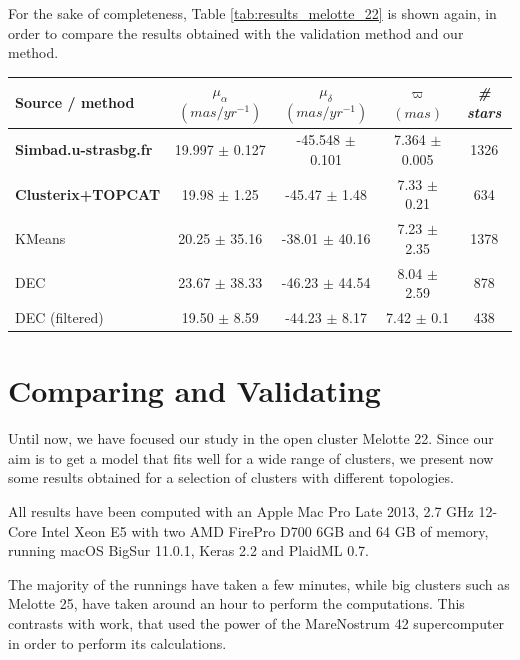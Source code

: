 \documentclass[11pt, a4paper, english]{book}
\begin{document}
For the sake of completeness, Table \ref{tab:results_melotte_22} is shown again,
in order to compare the results obtained with the validation method and our method.

\begin{table}[h!]
  \begin{center}
    \begin{tabular}{l|c|c|c|c}
      \textbf{Source / method} & \textbf{$\mu_{\alpha}$ $(mas/yr^{-1})$} & \textbf{$\mu_{\delta}$ $(mas/yr^{-1})$} & \textbf{$\varpi$ $(mas)$} & \emph{\# stars} \\
      \hline
      \textbf{Simbad.u-strasbg.fr} & 19.997 $\pm$ 0.127 & -45.548 $\pm$ 0.101 & 7.364 $\pm$ 0.005 & 1326 \\
      \textbf{Clusterix+TOPCAT} & 19.98 $\pm$ 1.25 & -45.47 $\pm$ 1.48 & 7.33 $\pm$ 0.21 & 634 \\
      KMeans & 20.25 $\pm$ 35.16 & -38.01 $\pm$ 40.16 & 7.23 $\pm$ 2.35 & 1378 \\
      DEC & 23.67 $\pm$ 38.33 & -46.23 $\pm$ 44.54 & 8.04 $\pm$ 2.59 & 878 \\
      DEC (filtered) & 19.50 $\pm$ 8.59 & -44.23 $\pm$ 8.17 & 7.42 $\pm$ 0.1 & 438 \\
    \end{tabular}
  \end{center}
\end{table}

\section{Comparing and Validating}

Until now, we have focused our study in the open cluster Melotte 22.
Since our aim is to get a model that fits well for a wide range of clusters,
we present now some results obtained for a selection of clusters with different topologies.

All results have been computed with an Apple Mac Pro Late 2013, 2.7 GHz 12-Core Intel Xeon E5 with two AMD FirePro D700 6GB and 64 GB
of memory, running macOS BigSur 11.0.1, Keras 2.2 and PlaidML 0.7.

The majority of the runnings have taken a few minutes, while big clusters such as Melotte 25, have taken around an hour to perform
the computations. This contrasts with  work, that used the power of the MareNostrum 42 supercomputer in order
to perform its calculations.

\newpage
\end{document}
